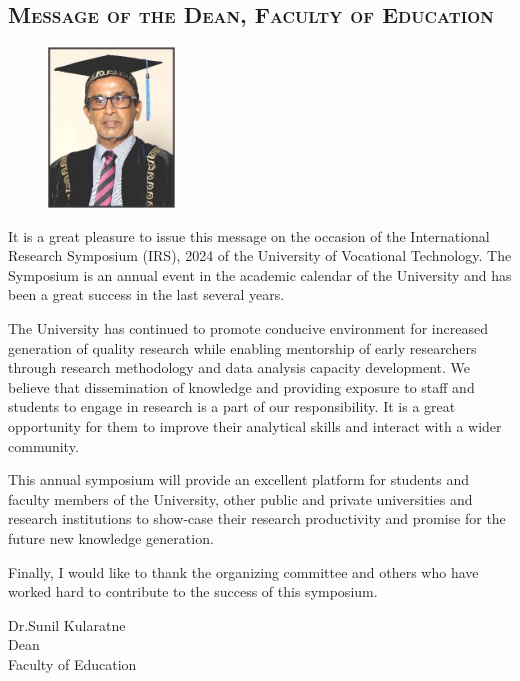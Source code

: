 \thispagestyle{fancy}
	
	\vspace{-2em} %
	\begin{center}



\subsection*{\textsc{Message of the Dean, Faculty of Education}}
	\end{center}

   
    
    \begin{figure}
		\includegraphics[width=0.3\textwidth]{Images/DeanFE.jpeg}
	\end{figure}
	\vspace{2em} %




	
	
	
	
	It is a great pleasure to issue this message on the occasion of the International Research Symposium (IRS), 2024 of the University of Vocational Technology. The Symposium is an annual event in the academic calendar of the University and has been a great success in the last several years.
    
The University has continued to promote conducive environment for increased generation of quality research while enabling mentorship of early researchers through research methodology and data analysis capacity development. We believe that dissemination of knowledge and providing    exposure to staff and students to engage in research is a part of our responsibility. It is a great opportunity for them to improve their analytical skills and interact with a wider community.

This annual symposium will provide an excellent platform for students and faculty members of the University, other public and private universities and research institutions to show-case their research productivity and promise for the future new knowledge generation.

Finally, I would like to thank the organizing committee and others who have worked hard to contribute to the success of this symposium.
 


	\vspace{1cm}
	\noindent
	Dr.Sunil Kularatne\\
Dean\\
Faculty of Education
	\newpage
	